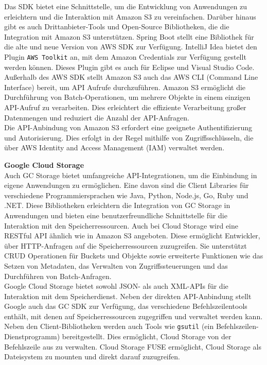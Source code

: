 Das SDK bietet eine Schnittstelle, um die Entwicklung von Anwendungen zu erleichtern und die Interaktion mit Amazon S3 zu vereinfachen. Darüber hinaus gibt es auch Drittanbieter-Tools und Open-Source Bibliotheken, die die Integration mit Amazon S3 unterstützen. Spring Boot stellt eine Bibliothek für die alte und neue Version von AWS SDK zur Verfügung. IntelliJ Idea bietet den Plugin \verb|AWS Toolkit| an, mit dem Amazon Credentials zur Verfügung gestellt werden können. Dieses Plugin gibt es auch für Eclipse und Visual Studio Code.\\

Außerhalb des AWS SDK stellt Amazon S3 auch das AWS CLI (Command Line Interface) bereit, um API Aufrufe durchzuführen. Amazon S3 ermöglicht die Durchführung von Batch-Operationen, um mehrere Objekte in einem einzigen API-Aufruf zu verarbeiten. Dies erleichtert die effiziente Verarbeitung großer Datenmengen und reduziert die Anzahl der API-Anfragen.\\

Die API-Anbindung von Amazon S3 erfordert eine geeignete Authentifizierung und Autorisierung. Dies erfolgt in der Regel mithilfe von Zugriffsschlüsseln, die über AWS Identity and Access Management (IAM) verwaltet werden.

\newpage

\textbf{Google Cloud Storage}\\

Auch GC Storage bietet umfangreiche API-Integrationen, um die Einbindung in eigene Anwendungen zu ermöglichen. Eine davon sind die Client Libraries für verschiedene Programmiersprachen wie Java, Python, Node.js, Go, Ruby und .NET. Diese Bibliotheken erleichtern die Integration von GC Storage in Anwendungen und bieten eine benutzerfreundliche Schnittstelle für die Interaktion mit den Speicherressourcen. Auch bei Cloud Storage wird eine RESTful API ähnlich wie in Amazon S3 angeboten. Diese ermöglicht Entwickler, über HTTP-Anfragen auf die Speicherressourcen zuzugreifen. Sie unterstützt CRUD Operationen für Buckets und Objekte sowie erweiterte Funktionen wie das Setzen von Metadaten, das Verwalten von Zugriffssteuerungen und das Durchführen von Batch-Anfragen.\\

Google Cloud Storage bietet sowohl JSON- als auch XML-APIs für die Interaktion mit dem Speicherdienst. Neben der direkten API-Anbindung stellt Google auch das GC SDK zur Verfügung, das verschiedene Befehlszeilentools enthält, mit denen auf Speicherressourcen zugegriffen und verwaltet werden kann. Neben den Client-Bibliotheken werden auch Tools wie \verb|gsutil| (ein Befehlszeilen-Dienstprogramm) bereitgestellt. Dies ermöglicht, Cloud Storage von der Befehlszeile aus zu verwalten. Cloud Storage FUSE ermöglicht, Cloud Storage als Dateisystem zu mounten und direkt darauf zuzugreifen.\\


